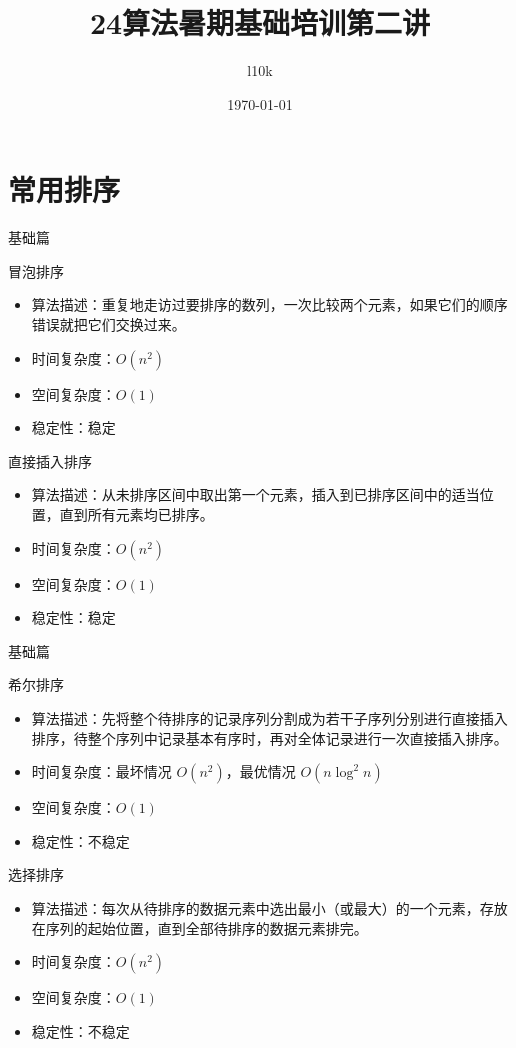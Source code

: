 \documentclass{beamer}
\title{24算法暑期基础培训第二讲}
\author{l10k}
\date{\today}
\begin{document}
\frame{\titlepage}

\section{常用排序}

\begin{frame}{基础篇}
    \begin{block}{冒泡排序}
        \begin{itemize}
            \item 算法描述：重复地走访过要排序的数列，一次比较两个元素，如果它们的顺序错误就把它们交换过来。
            \item 时间复杂度：$O(n^2)$
            \item 空间复杂度：$O(1)$
            \item 稳定性：稳定
        \end{itemize}
    \end{block}

    \begin{block}{直接插入排序}
        \begin{itemize}
            \item 算法描述：从未排序区间中取出第一个元素，插入到已排序区间中的适当位置，直到所有元素均已排序。
            \item 时间复杂度：$O(n^2)$
            \item 空间复杂度：$O(1)$
            \item 稳定性：稳定
        \end{itemize}
    \end{block}
\end{frame}

\begin{frame}{基础篇}
    \begin{block}{希尔排序}
        \begin{itemize}
            \item 算法描述：先将整个待排序的记录序列分割成为若干子序列分别进行直接插入排序，待整个序列中记录基本有序时，再对全体记录进行一次直接插入排序。
            \item 时间复杂度：最坏情况 $O(n^2)$，最优情况 $O(n \log^2 n)$
            \item 空间复杂度：$O(1)$
            \item 稳定性：不稳定
        \end{itemize}
    \end{block}

    \begin{block}{选择排序}
        \begin{itemize}
            \item 算法描述：每次从待排序的数据元素中选出最小（或最大）的一个元素，存放在序列的起始位置，直到全部待排序的数据元素排完。
            \item 时间复杂度：$O(n^2)$
            \item 空间复杂度：$O(1)$
            \item 稳定性：不稳定
        \end{itemize}
    \end{block}
\end{frame}
\end{document}
